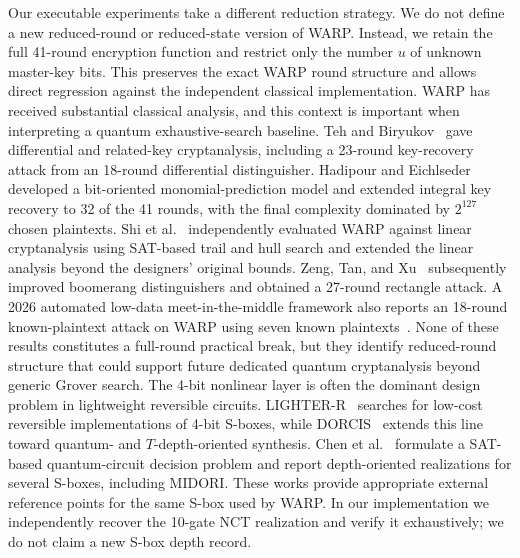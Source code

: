 \documentclass[10pt,a4paper]{article}
\begin{document}
Our executable experiments take a different reduction strategy. We do not define a new reduced-round or reduced-state version of WARP. Instead, we retain the full 41-round encryption function and restrict only the number $u$ of unknown master-key bits. This preserves the exact WARP round structure and allows direct regression against the independent classical implementation.
WARP has received substantial classical analysis, and this context is important when interpreting a quantum exhaustive-search baseline. Teh and Biryukov~\cite{Teh2022} gave differential and related-key cryptanalysis, including a 23-round key-recovery attack from an 18-round differential distinguisher. Hadipour and Eichlseder~\cite{Hadipour2022} developed a bit-oriented monomial-prediction model and extended integral key recovery to 32 of the 41 rounds, with the final complexity dominated by $2^{127}$ chosen plaintexts. Shi et al.~\cite{Shi2023} independently evaluated WARP against linear cryptanalysis using SAT-based trail and hull search and extended the linear analysis beyond the designers' original bounds. Zeng, Tan, and Xu~\cite{Zeng2025} subsequently improved boomerang distinguishers and obtained a 27-round rectangle attack. A 2026 automated low-data meet-in-the-middle framework also reports an 18-round known-plaintext attack on WARP using seven known plaintexts~\cite{Vaziri2026}. None of these results constitutes a full-round practical break, but they identify reduced-round structure that could support future dedicated quantum cryptanalysis beyond generic Grover search.
The 4-bit nonlinear layer is often the dominant design problem in lightweight reversible circuits. LIGHTER-R~\cite{Dasu2019} searches for low-cost reversible implementations of 4-bit S-boxes, while DORCIS~\cite{DORCIS2023} extends this line toward quantum- and $T$-depth-oriented synthesis. Chen et al.~\cite{Chen2024} formulate a SAT-based quantum-circuit decision problem and report depth-oriented realizations for several S-boxes, including MIDORI. These works provide appropriate external reference points for the same S-box used by WARP. In our implementation we independently recover the 10-gate NCT realization and verify it exhaustively; we do not claim a new S-box depth record.
\end{document}
